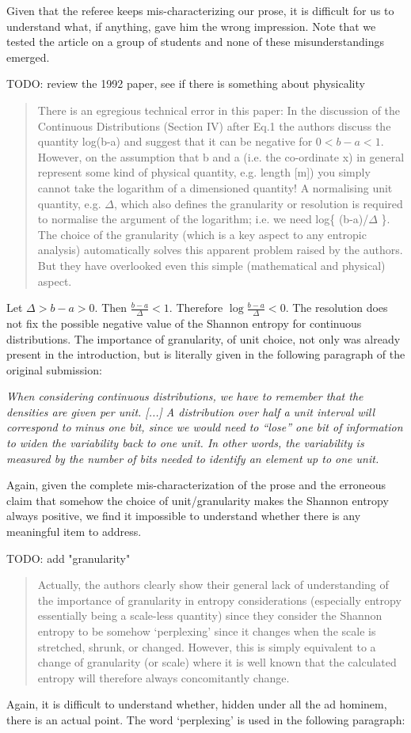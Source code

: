 \documentclass[11pt]{article}
\begin{document}
Given that the referee keeps mis-characterizing our prose, it is difficult for us to understand what, if anything, gave him the wrong impression. Note that we tested the article on a group of students and none of these misunderstandings emerged.

TODO: review the 1992 paper, see if there is something about physicality

\begin{quote}
	There is an egregious technical error in this paper: In the discussion of the Continuous Distributions (Section IV) after Eq.1 the authors discuss the quantity log(b-a) and suggest that it can be negative for $0<b-a<1$. However, on the assumption that b and a (i.e. the co-ordinate x) in general represent some kind of physical quantity, e.g. length [m]) you simply cannot take the logarithm of a dimensioned quantity! A normalising unit quantity, e.g. $\Delta$, which also defines the granularity or resolution is required to normalise the argument of the logarithm; i.e. we need log\{ (b-a)/$\Delta$ \}. The choice of the granularity (which is a key aspect to any entropic analysis) automatically solves this apparent problem raised by the authors. But they have overlooked even this simple (mathematical and physical) aspect.
\end{quote}
Let $\Delta > b - a > 0$. Then $\frac{b-a}{\Delta} < 1$. Therefore $\log \frac{b-a}{\Delta} < 0$. The resolution does not fix the possible negative value of the Shannon entropy for continuous distributions. The importance of granularity, of unit choice, not only was already present in the introduction, but is literally given in the following paragraph of the original submission:

\emph{	When considering continuous distributions, we have to remember that the densities are given per unit. [...] A distribution over half a unit interval will correspond to minus one bit, since we would need to ``lose'' one bit of information to widen the variability back to one unit. In other words, the variability is measured by the number of bits needed to identify an element up to one unit.}

Again, given the complete mis-characterization of the prose and the erroneous claim that somehow the choice of unit/granularity makes the Shannon entropy always positive, we find it impossible to understand whether there is any meaningful item to address.

TODO: add "granularity"

\begin{quote}
Actually, the authors clearly show their general lack of understanding of the importance of granularity in entropy considerations (especially entropy essentially being a scale-less quantity) since they consider the Shannon entropy to be somehow ‘perplexing’ since it changes when the scale is stretched, shrunk, or changed. However, this is simply equivalent to a change of granularity (or scale) where it is well known that the calculated entropy will therefore always concomitantly change. 
\end{quote}
Again, it is difficult to understand whether, hidden under all the ad hominem, there is an actual point. The word `perplexing' is used in the following paragraph:
\end{document}
